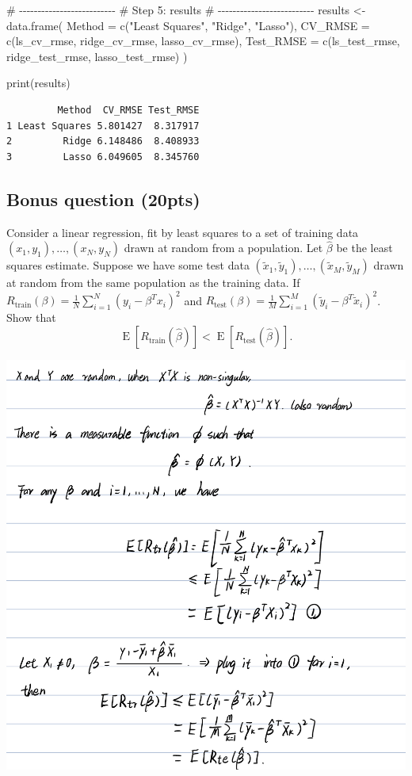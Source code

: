 \documentclass[
  letterpaper,
  DIV=11,
  numbers=noendperiod]{scrartcl}
\newenvironment{Shaded}{\begin{snugshade}}{\end{snugshade}}
\newcommand{\AttributeTok}[1]{\textcolor[rgb]{0.40,0.45,0.13}{#1}}
\newcommand{\CommentTok}[1]{\textcolor[rgb]{0.37,0.37,0.37}{#1}}
\newcommand{\FunctionTok}[1]{\textcolor[rgb]{0.28,0.35,0.67}{#1}}
\newcommand{\NormalTok}[1]{\textcolor[rgb]{0.00,0.23,0.31}{#1}}
\newcommand{\OtherTok}[1]{\textcolor[rgb]{0.00,0.23,0.31}{#1}}
\newcommand{\StringTok}[1]{\textcolor[rgb]{0.13,0.47,0.30}{#1}}
\begin{document}
\begin{Shaded}
\begin{Highlighting}[]
\CommentTok{\# {-}{-}{-}{-}{-}{-}{-}{-}{-}{-}{-}{-}{-}{-}{-}{-}{-}{-}{-}{-}{-}{-}{-}{-}{-}{-}}
\CommentTok{\# Step 5: results}
\CommentTok{\# {-}{-}{-}{-}{-}{-}{-}{-}{-}{-}{-}{-}{-}{-}{-}{-}{-}{-}{-}{-}{-}{-}{-}{-}{-}{-}}
\NormalTok{results }\OtherTok{\textless{}{-}} \FunctionTok{data.frame}\NormalTok{(}
  \AttributeTok{Method =} \FunctionTok{c}\NormalTok{(}\StringTok{"Least Squares"}\NormalTok{, }\StringTok{"Ridge"}\NormalTok{, }\StringTok{"Lasso"}\NormalTok{),}
  \AttributeTok{CV\_RMSE =} \FunctionTok{c}\NormalTok{(ls\_cv\_rmse, ridge\_cv\_rmse, lasso\_cv\_rmse),}
  \AttributeTok{Test\_RMSE =} \FunctionTok{c}\NormalTok{(ls\_test\_rmse, ridge\_test\_rmse, lasso\_test\_rmse)}
\NormalTok{)}

\FunctionTok{print}\NormalTok{(results)}
\end{Highlighting}
\end{Shaded}

\begin{verbatim}
         Method  CV_RMSE Test_RMSE
1 Least Squares 5.801427  8.317917
2         Ridge 6.148486  8.408933
3         Lasso 6.049605  8.345760
\end{verbatim}

\subsection{Bonus question (20pts)}\label{bonus-question-20pts}

Consider a linear regression, fit by least squares to a set of training
data \((x_1, y_1), \ldots, (x_N,  y_N)\) drawn at random from a
population. Let \(\hat \beta\) be the least squares estimate. Suppose we
have some test data
\((\tilde{x}_1, \tilde{y}_1), \ldots, (\tilde{x}_M, \tilde{y}_M)\) drawn
at random from the same population as the training data. If
\(R_{\text{train}}(\beta) = \frac{1}{N} \sum_{i=1}^N (y_i - \beta^T x_i)^2\)
and
\(R_{\text{test}}(\beta) = \frac{1}{M} \sum_{i=1}^M (\tilde{y}_i - \beta^T \tilde{x}_i)^2\).
Show that \[
\operatorname{E}[R_{\text{train}}(\hat{\beta})] < \operatorname{E}[R_{\text{test}}(\hat{\beta})].
\]

\begin{center}
\includegraphics{IMG_3CF00996EB9E-1.jpeg}
\end{center}
\end{document}
